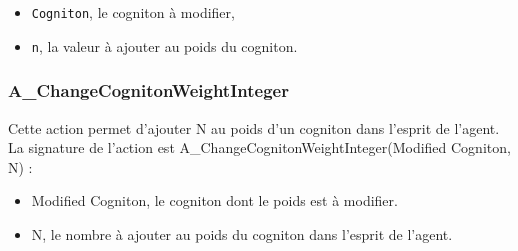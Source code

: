 	\begin{itemize}
	\item \texttt{Cogniton},  le cogniton à modifier,
	\item \texttt{n}, la valeur à ajouter au poids du cogniton. 
	\end{itemize}
	
	\subsubsection{A\_ChangeCognitonWeightInteger}

Cette action permet d'ajouter N au poids d'un cogniton dans l'esprit de l'agent.
La signature de l'action est A\_ChangeCognitonWeightInteger(Modified Cogniton, N) :
\begin{itemize}
\item Modified Cogniton, le cogniton dont le poids est à modifier.
\item N, le nombre à ajouter au poids du cogniton dans l'esprit de l'agent.
\end{itemize}

